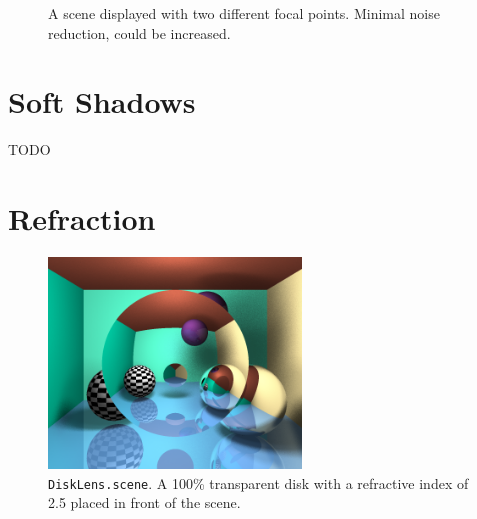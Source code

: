 \documentclass{article}
\begin{document}
\begin{figure}[H]
    \centering
    \caption{A scene displayed with two different focal points. Minimal noise reduction, could be increased.}
\end{figure}

\section{Soft Shadows}

TODO

\section{Refraction}

\begin{figure}[H]
    \centering
    \includegraphics[width=0.6\textwidth]{./examples/DiskLens.png}
    \caption{\texttt{DiskLens.scene}. A 100\% transparent disk with a refractive index of 2.5 placed in front of the scene.}
\end{figure}
\end{document}
